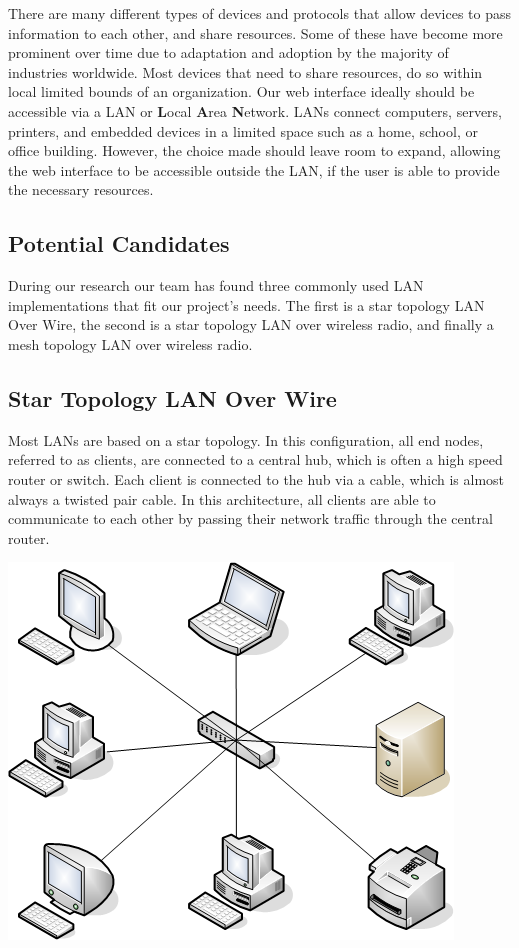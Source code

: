 \documentclass[onecolumn, draftclsnofoot,10pt, compsoc]{IEEEtran}
\begin{document}
		There are many different types of devices and protocols that allow devices to pass information to each other, and share resources.
		Some of these have become more prominent over time due to adaptation and adoption by the majority of industries worldwide.
		Most devices that need to share resources, do so within local limited bounds of an organization.
		Our web interface ideally should be accessible via a LAN or \textbf{L}ocal \textbf{A}rea \textbf{N}etwork.
		LANs connect computers, servers, printers, and embedded devices in a limited space such as a home, school, or office building. \cite{LAN1}
		However, the choice made should leave room to expand, allowing the web interface to be accessible outside the LAN, if the user is able to provide the necessary resources.

		\subsection{Potential Candidates}
		During our research our team has found three commonly used LAN implementations that fit our project's needs.
		The first is a star topology LAN Over Wire, the second is a star topology LAN over wireless radio, and finally a mesh topology LAN over wireless radio.

		\subsection{Star Topology LAN Over Wire}
		Most LANs are based on a star topology.  In this configuration, all end nodes, referred to as clients, are connected to a central hub, which is often a high speed router or switch.
		Each client is connected to the hub via a cable, which is almost always a twisted pair cable.\cite{LAN2}
		In this architecture, all clients are able to communicate to each other by passing their network traffic through the central router.

		\begin{center}
			\includegraphics[scale=0.5]{Star_Topology.png}
		\end{center}
\end{document}
